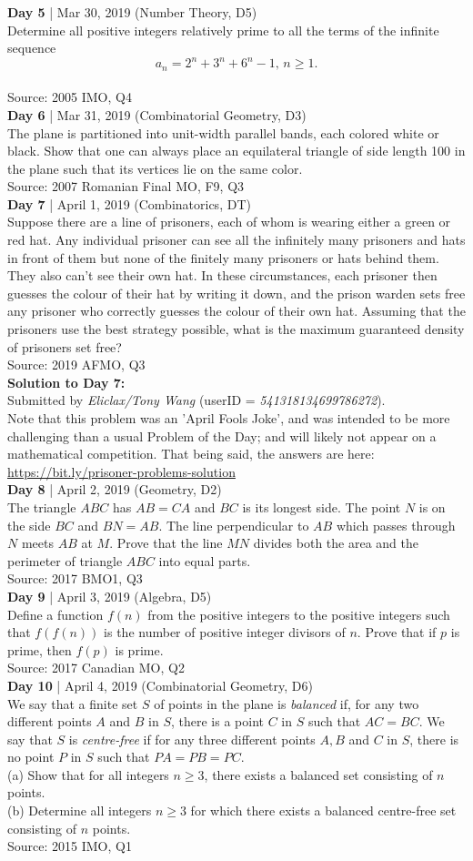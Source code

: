 \documentclass{article}
\newcommand{\problem}[6]{
\textbf{Day #1} | #2 (#5, D#6)\\
#4 \\
Source: #3\\
}
\newcommand{\solution}[4]{
\textbf{Solution to Day #1:}\\
Submitted by \textit{#2} (userID = \textit{#3}). \\
#4\\
}
\begin{document}
\problem{5}{Mar 30, 2019}{2005 IMO, Q4}{Determine all positive integers relatively prime to all the terms of the infinite sequence \[a_n=2^n+3^n+6^n -1,\, n\geq 1.\]}{Number Theory}{5}

\problem{6}{Mar 31, 2019}{2007 Romanian Final MO, F9, Q3}{The plane is partitioned into unit-width parallel bands, each colored white or black. Show that one can always place an equilateral triangle of side length 100 in the plane such that its vertices lie on the same color.}{Combinatorial Geometry}{3}

\problem{7}{April 1, 2019}{2019 AFMO, Q3}{Suppose there are a line of prisoners, each of whom is wearing either a green or red hat. Any individual prisoner can see all the infinitely many prisoners and hats in front of them but none of the finitely many prisoners or hats behind them. They also can't see their own hat. In these circumstances, each prisoner then guesses the colour of their hat by writing it down, and the prison warden sets free any prisoner who correctly guesses the colour of their own hat. Assuming that the prisoners use the best strategy possible, what is the maximum guaranteed density of prisoners set free?}{Combinatorics}{T}

\solution{7}{Eliclax/Tony Wang}{541318134699786272}{Note that this problem was an 'April Fools Joke', and was intended to be more challenging than a usual Problem of the Day; and will likely not appear on a mathematical competition. That being said, the answers are here: \url{https://bit.ly/prisoner-problems-solution}}

\problem{8}{April 2, 2019}{2017 BMO1, Q3}{The triangle $ABC$ has $AB = CA$ and $BC$ is its longest side. The point $N$ is on the side $BC$ and $BN = AB$. The line perpendicular to $AB$ which passes through $N$ meets $AB$ at $M$. Prove that the line $MN$ divides both the area and the perimeter of triangle $ABC$ into equal parts.}{Geometry}{2}

\problem{9}{April 3, 2019}{2017 Canadian MO, Q2}{Define a function $f(n)$ from the positive integers to the positive integers such that $f(f(n))$ is the number of positive integer divisors of $n$. Prove that if $p$ is prime, then $f(p)$ is prime.}{Algebra}{5}

\problem{10}{April 4, 2019}{2015 IMO, Q1}{We say that a finite set $S$ of points in the plane is \textit{balanced} if, for any two different points $A$ and $B$ in $S$, there is a point $C$ in $S$ such that $AC = BC$. We say that $S$ is \textit{centre-free} if for any three different points $A, B$ and $C$ in $S$, there is no point $P$ in $S$ such that $PA = PB = PC$. \\ \space\space(a) Show that for all integers $n \geq 3$, there exists a balanced set consisting of $n$ points.\
	\\ \space\space(b) Determine all integers $n \geq 3$ for which there exists a balanced centre-free set consisting of $n$ points.}{Combinatorial Geometry}{6}
\end{document}
